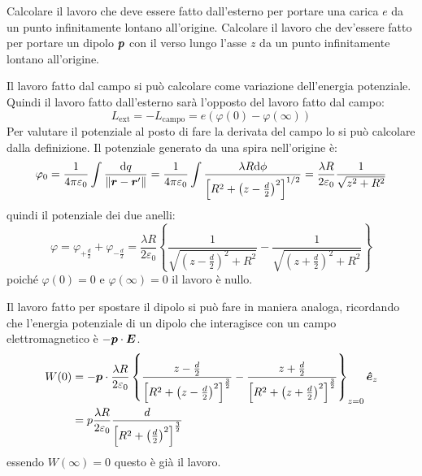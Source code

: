 \begin{Es}
  Calcolare il lavoro che deve essere fatto dall'esterno per portare una carica $e$ da un punto infinitamente lontano all'origine. Calcolare il lavoro che dev'essere fatto per portare un dipolo $\boldsymbol{p}$ con il verso lungo l'asse $z$ da un punto infinitamente lontano all'origine.

  Il lavoro fatto dal campo si può calcolare come variazione dell'energia potenziale. Quindi il lavoro fatto dall'esterno sarà l'opposto del lavoro fatto dal campo:
  \begin{equation*}
   L_\text{ext} = -L_\text{campo} = e(\varphi(0)-\varphi(\infty))
  \end{equation*}
   Per valutare il potenziale al posto di fare la derivata del campo lo si può calcolare dalla definizione. Il potenziale generato da una spira nell'origine è:
  \begin{equation*}
   \varphi_0 = \frac{1}{4\pi\varepsilon_0}\int\frac{\mathrm{d} q}{\left\lVert\boldsymbol{r} - \boldsymbol{r}'\right\rVert} = \frac{1}{4\pi\varepsilon_0}\int\frac{\lambda R\mathrm{d}\phi}{\left[R^2+\left(z-\frac{d}{2}\right)^2\right]^{1/2}}=\frac{\lambda R}{2\varepsilon_0}\frac{1}{\sqrt{z^2+R^2}}
  \end{equation*}
   quindi il potenziale dei due anelli:
  \begin{equation*}
   \varphi = \varphi_{+\frac{d}{2}} + \varphi_{-\frac{d}{2}} = \frac{\lambda R}{2\varepsilon_0}\left\{\frac{1}{\sqrt{\left(z-\frac{d}{2}\right)^2+R^2}}-\frac{1}{\sqrt{\left(z+\frac{d}{2}\right)^2+R^2}}\right\}
  \end{equation*}
  poiché $\varphi(0)=0$ e $\varphi(\infty)=0$ il lavoro è nullo.

  Il lavoro fatto per spostare il dipolo si può fare in maniera analoga, ricordando che l'energia potenziale di un dipolo che interagisce con un campo elettromagnetico è $-\boldsymbol{p}\cdot \boldsymbol{E}$.
  \begin{align*}
   W(0) &= -\boldsymbol{p}\cdot \frac{\lambda R}{2\varepsilon_0}\left\{
                  \frac{z-\frac{d}{2}}{\left[R^2+\left(z-\frac{d}{2}\right)^2\right]^{\frac{3}{2}}}
                 -\frac{z+\frac{d}{2}}{\left[R^2+\left(z+\frac{d}{2}\right)^2\right]^{\frac{3}{2}}}\right\}_{z=0}\boldsymbol{\hat {e}}_z\\
        &= p\frac{\lambda R}{2\varepsilon_0}
                  \frac{d}{\left[R^2+\left(\frac{d}{2}\right)^2\right]^{\frac{3}{2}}}
  \end{align*}
essendo $W(\infty)=0$ questo è già il lavoro.
\end{Es}



